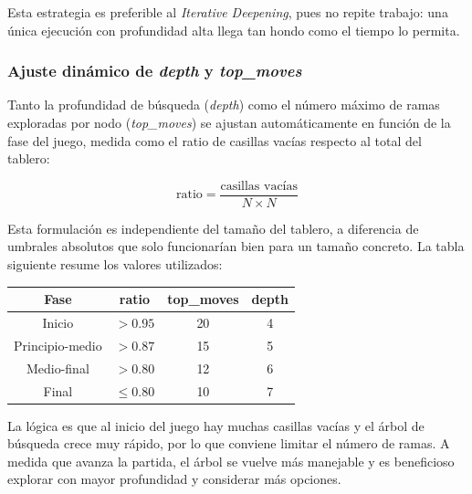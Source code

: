 \documentclass[spanish]{article}
\begin{document}
Esta estrategia es preferible al \textit{Iterative Deepening}, pues no repite trabajo: una \'unica ejecuci\'on con profundidad alta llega tan hondo como el tiempo lo permita.

\subsubsection*{Ajuste din\'amico de \textit{depth} y \textit{top\_moves}}

Tanto la profundidad de b\'usqueda (\textit{depth}) como el n\'umero m\'aximo de ramas exploradas por nodo (\textit{top\_moves}) se ajustan autom\'aticamente en funci\'on de la fase del juego, medida como el ratio de casillas vac\'ias respecto al total del tablero:

\[
    \text{ratio} = \frac{\text{casillas vac\'ias}}{N \times N}
\]

Esta formulaci\'on es independiente del tama\~no del tablero, a diferencia de umbrales absolutos que solo funcionar\'ian bien para un tama\~no concreto. La tabla siguiente resume los valores utilizados:

\begin{center}
\begin{tabular}{|c|c|c|c|}
\hline
\textbf{Fase} & \textbf{ratio} & \textbf{top\_moves} & \textbf{depth} \\
\hline
Inicio       & $> 0.95$ & 20 & 4 \\
Principio-medio & $> 0.87$ & 15 & 5 \\
Medio-final  & $> 0.80$ & 12  & 6 \\
Final        & $\leq 0.80$ & 10 & 7 \\
\hline
\end{tabular}
\end{center}

La l\'ogica es que al inicio del juego hay muchas casillas vac\'ias y el \'arbol de b\'usqueda crece muy r\'apido, por lo que conviene limitar el n\'umero de ramas. A medida que avanza la partida, el \'arbol se vuelve m\'as manejable y es beneficioso explorar con mayor profundidad y considerar m\'as opciones.
\end{document}
